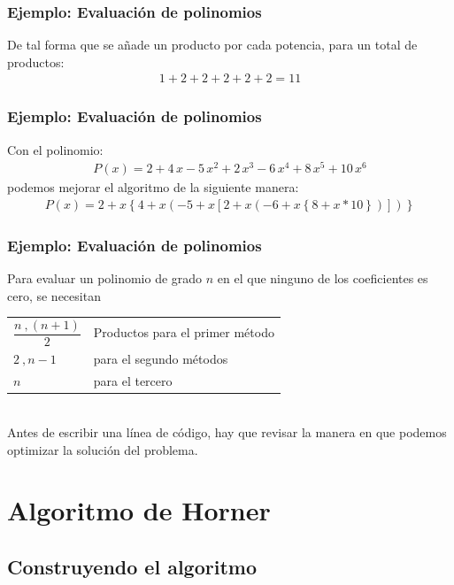 \documentclass[12pt]{beamer}
\begin{document}
\begin{frame}
\frametitle{Ejemplo: Evaluación de polinomios}
De tal forma que se añade un producto por cada potencia, para un total de productos:
\begin{align*}
1 + 2 + 2 + 2 + 2 + 2 = 11
\end{align*}
\end{frame}
\begin{frame}
\frametitle{Ejemplo: Evaluación de polinomios}
Con el polinomio:
\begin{align*}
P (x) = 2 + 4 \, x - 5 \,  x^{2} + 2 \, x^{3} - 6 \, x^{4} + 8 \,  x^{5} + 10 \, x^{6}
\end{align*}
\pause
podemos mejorar el algoritmo de la siguiente manera:
\pause
\fontsize{12}{12}\selectfont
\begin{align*}
P (x) = 2 + x \left\lbrace 4 + x \left( -5 + x \left[ 2 + x \left(-6 +x \left\lbrace 8+x*10 \right\rbrace \right) \right] \right) \right\rbrace 
\end{align*}
\end{frame}
\begin{frame}
\frametitle{Ejemplo: Evaluación de polinomios}
Para evaluar un polinomio de grado $n$ en el que ninguno de los coeficientes es cero, se necesitan
\\
\medskip
\pause
\begin{tabular}{l l}
$\dfrac{n\ , (n + 1)}{2}$ & Productos para el primer método \\
$2\ , n - 1$ & para el segundo métodos \\
$n$ & para el tercero
\end{tabular}
\\
\medskip
\pause
Antes de escribir una línea de código, hay que revisar la manera en que podemos optimizar la solución del problema.
\end{frame}

\section{Algoritmo de Horner}
\subsection{Construyendo el algoritmo}
\end{document}
